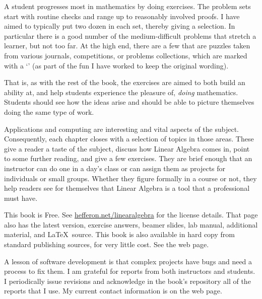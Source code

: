 {A student progresses most in mathematics by doing exercises. 
The problem sets start with 
routine checks and range up to reasonably involved proofs.
I have aimed to typically put two dozen in each set, 
thereby giving a selection.
In particular there is a good number of the medium-difficult problems
that stretch a learner, but not too far.
At the high end, there are a few that are puzzles
taken from various journals, competitions, or
problems collections, which  
are marked with a
`\puzzlemark'  
(as part of the fun I have worked to keep the original wording).

That is, as with the rest of the book, 
the exercises are aimed to both build an ability at,
and help students experience the pleasure of, 
\emph{doing} mathematics.
Students should see how the ideas arise and should be able to 
picture themselves doing the same type of work.


\medskip
{}
Applications and computing are interesting and vital aspects 
of the subject.
Consequently, each chapter closes with a selection of
topics in those areas.
These give a reader
a taste of the subject, discuss how Linear Algebra comes in,
point to some further reading, and give a few exercises. 
They are brief enough that an instructor can do one
in a day's class 
or can assign them as projects for individuals or small groups.
Whether they figure formally in a course or not, they help
readers see for themselves that Linear Algebra is a tool
that a professional must have. 




\medskip
{}
This book is Free.
See \url{hefferon.net/linearalgebra}
for the license details.
That page also has the latest version, 
exercise answers, beamer slides, lab manual, additional material,
and \LaTeX\ source.
This book is also available in hard copy
from standard publishing sources, for very little cost.
See the web page.



\medskip
{}
A lesson of software
development is that complex projects have bugs
and need a process to fix them.
I am grateful for reports from both instructors and students.
I periodically issue revisions and acknowledge in the book's repository
all of the reports that I use. 
My current contact information is on the web page.

}
